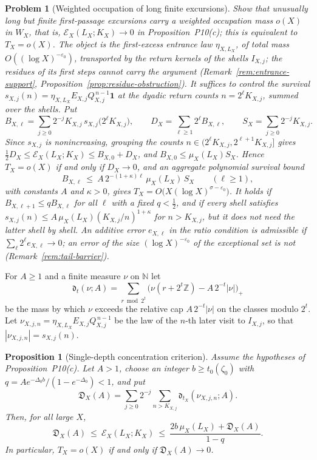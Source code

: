 \documentclass[11pt]{article}
\newtheorem{proposition}[theorem]{Proposition}
\newtheorem{problem}[theorem]{Problem}
\theoremstyle{remark}
\newcommand{\N}{\mathbb{N}}
\newcommand{\Z}{\mathbb{Z}}
\begin{document}
\begin{problem}[Weighted occupation of long finite excursions]
\label{prob:excursions}
Show that unusually long but finite first-passage excursions carry a weighted occupation mass $o(X)$ in $W_X$, that is, $\mathcal E_X(L_X;K_X)\to0$ in Proposition~P10(c); this is equivalent to $T_X=o(X)$. The object is the first-excess entrance law $\eta_{X,L_X}$, of total mass $O((\log X)^{-\varepsilon_0})$, transported by the return kernels of the shells $I_{X,j}$; the residues of its first steps cannot carry the argument (Remark~\ref{rem:entrance-support}, Proposition~\ref{prop:residue-obstruction}). It suffices to control the survival $s_{X,j}(n)=\eta_{X,L_X}E_{X,j}Q_{X,j}^{\,n-1}\mathbf 1$ at the dyadic return counts $n=2^\ell K_{X,j}$, summed over the shells. Put
\[
 B_{X,\ell}=\sum_{j\ge0}2^{-j}K_{X,j}\,s_{X,j}\bigl(2^\ell K_{X,j}\bigr),\qquad D_X=\sum_{\ell\ge1}2^\ell B_{X,\ell},\qquad S_X=\sum_{j\ge0}2^{-j}K_{X,j}.
\]
Since $s_{X,j}$ is nonincreasing, grouping the counts $n\in(2^\ell K_{X,j},2^{\ell+1}K_{X,j}]$ gives $\frac12D_X\le\mathcal E_X(L_X;K_X)\le B_{X,0}+D_X$, and $B_{X,0}\le\mu_X(L_X)S_X$. Hence $T_X=o(X)$ if and only if $D_X\to0$, and an aggregate polynomial survival bound
\[
 B_{X,\ell}\ \le\ A\,2^{-(1+\kappa)\ell}\,\mu_X(L_X)\,S_X\qquad(\ell\ge1),
\]
with constants $A$ and $\kappa>0$, gives $T_X=O\bigl(X(\log X)^{\sigma-\varepsilon_0}\bigr)$. It holds if $B_{X,\ell+1}\le qB_{X,\ell}$ for all $\ell$ with a fixed $q<\frac12$, and if every shell satisfies $s_{X,j}(n)\le A\,\mu_X(L_X)(K_{X,j}/n)^{1+\kappa}$ for $n>K_{X,j}$, but it does not need the latter shell by shell. An additive error $e_{X,\ell}$ in the ratio condition is admissible if $\sum_\ell2^\ell e_{X,\ell}\to0$; an error of the size $(\log X)^{-\varepsilon_0}$ of the exceptional set is not (Remark~\ref{rem:tail-barrier}).
\end{problem}

For $A\ge1$ and a finite measure $\nu$ on $\N$ let
\[
 \mathfrak d_t(\nu;A)=\sum_{r\bmod2^t}\bigl(\nu(r+2^t\Z)-A\,2^{-t}|\nu|\bigr)_+
\]
be the mass by which $\nu$ exceeds the relative cap $A\,2^{-t}|\nu|$ on the classes modulo $2^t$. Let $\nu_{X,j,n}=\eta_{X,L_X}E_{X,j}Q_{X,j}^{\,n-1}$ be the law of the $n$-th later visit to $I_{X,j}$, so that $|\nu_{X,j,n}|=s_{X,j}(n)$.

\begin{proposition}[Single-depth concentration criterion]
\label{prop:single-depth}
Assume the hypotheses of Proposition~P10(c). Let $A>1$, choose an integer $b\ge t_0(\zeta_0)$ with $q=Ae^{-\Delta_0b}/(1-e^{-\Delta_0})<1$, and put
\[
 \mathfrak D_X(A)=\sum_{j\ge0}2^{-j}\sum_{n>K_{X,j}}\mathfrak d_{t_X}(\nu_{X,j,n};A).
\]
Then, for all large $X$,
\[
 \mathfrak D_X(A)\ \le\ \mathcal E_X(L_X;K_X)\ \le\ \frac{2b\,\mu_X(L_X)+\mathfrak D_X(A)}{1-q}.
\]
In particular, $T_X=o(X)$ if and only if $\mathfrak D_X(A)\to0$.
\end{proposition}
\end{document}
